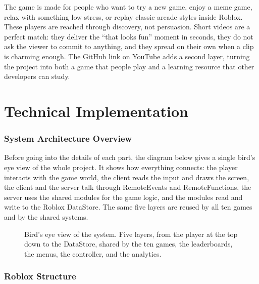 \documentclass[12pt,letterpaper]{article}
\begin{document}
The game is made for people who want to try a new game, enjoy a meme game, relax with something low stress, or replay classic arcade styles inside Roblox. These players are reached through discovery, not persuasion. Short videos are a perfect match: they deliver the ``that looks fun'' moment in seconds, they do not ask the viewer to commit to anything, and they spread on their own when a clip is charming enough. The GitHub link on YouTube adds a second layer, turning the project into both a game that people play and a learning resource that other developers can study.

\part{Technical Implementation}

\section{System Architecture Overview}

Before going into the details of each part, the diagram below gives a single bird's eye view of the whole project. It shows how everything connects: the player interacts with the game world, the client reads the input and draws the screen, the client and the server talk through RemoteEvents and RemoteFunctions, the server uses the shared modules for the game logic, and the modules read and write to the Roblox DataStore. The same five layers are reused by all ten games and by the shared systems.

\begin{figure}[H]
  \centering
  \resizebox{\textwidth}{!}{}
  \caption{Bird's eye view of the system. Five layers, from the player at the top down to the DataStore, shared by the ten games, the leaderboards, the menus, the controller, and the analytics.}
  \label{fig:architecture_overview}
\end{figure}

\clearpage

\section{Roblox Structure}
\end{document}
